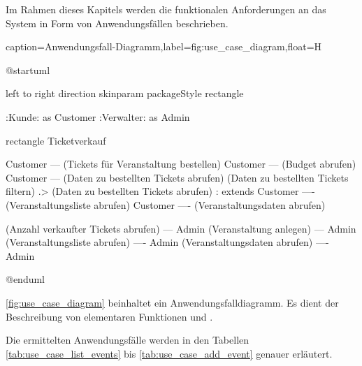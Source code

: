 Im Rahmen dieses Kapitels werden die funktionalen Anforderungen an das System in Form von Anwendungsfällen beschrieben. 

\begin{dhbwfigure}{caption=Anwendungsfall-Diagramm,label=fig:use_case_diagram,float=H}
    \begin{plantuml}
        @startuml

            left to right direction
            skinparam packageStyle rectangle

            :Kunde: as Customer
            :Verwalter: as Admin

            rectangle Ticketverkauf {
                Customer --- (Tickets für Veranstaltung bestellen)
                Customer --- (Budget abrufen)
                Customer --- (Daten zu bestellten Tickets abrufen)
                (Daten zu bestellten Tickets filtern) .> (Daten zu bestellten Tickets abrufen) : extends
                Customer ---- (Veranstaltungsliste abrufen)
                Customer ---- (Veranstaltungsdaten abrufen)

                (Anzahl verkaufter Tickets abrufen) --- Admin
                (Veranstaltung anlegen) --- Admin
                (Veranstaltungsliste abrufen) ---- Admin
                (Veranstaltungsdaten abrufen) ---- Admin
            }
        @enduml
    \end{plantuml}
\end{dhbwfigure}

\autoref{fig:use_case_diagram} beinhaltet ein Anwendungsfalldiagramm.
Es dient der Beschreibung von elementaren Funktionen und .

Die ermittelten Anwendungsfälle werden in den Tabellen \ref{tab:use_case_list_events} bis \ref{tab:use_case_add_event} genauer erläutert. %

